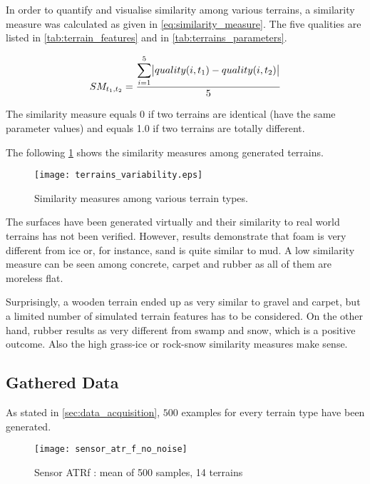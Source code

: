 In order to quantify and visualise similarity among various terrains, a similarity measure was calculated as given in \cref{eq:similarity_measure}. The five qualities are listed in \cref{tab:terrain_features} and in \cref{tab:terrains_parameters}.

\begin{align} \label{eq:similarity_measure}
  SM_{t_1, t_2} = \frac{\displaystyle\sum_{i=1}^{5} \abs{quality(i, t_1) - quality(i, t_2)}}{5}
\end{align} 

The similarity measure equals 0 if two terrains are identical (have the same parameter values) and equals 1.0 if two terrains are totally different.

The following \cref{fig:terrain_similarity_measures} shows the similarity measures among generated terrains.

\begin{figure}[H]
  \centering
  \texttt{[image: terrains\_variability.eps]}
  \caption{Similarity measures among various terrain types.}
  \label{fig:terrain_similarity_measures}
\end{figure}

The surfaces have been generated virtually and their similarity to real world terrains has not been verified. However, results demonstrate that foam is very different from ice or, for instance, sand is quite similar to mud. A low similarity measure can be seen among concrete, carpet and rubber as all of them are moreless flat.

Surprisingly, a wooden terrain ended up as very similar to gravel and carpet, but a limited number of simulated terrain features has to be considered. 
On the other hand, rubber results as very different from swamp and snow, which is a positive outcome. Also the high grass-ice or rock-snow similarity measures make sense. 

\subsection{Gathered Data} \label{ssec:gathered_data}
As stated in \cref{sec:data_acquisition}, $ 500 $ examples for every terrain type have been generated.

\begin{figure}[H]
  \centering
  \texttt{[image: sensor\_atr\_f\_no\_noise]}
  \caption{Sensor ATRf : mean of 500 samples, 14 terrains}
  \label{fig:sensor_atr_f_no_noise}
\end{figure}

